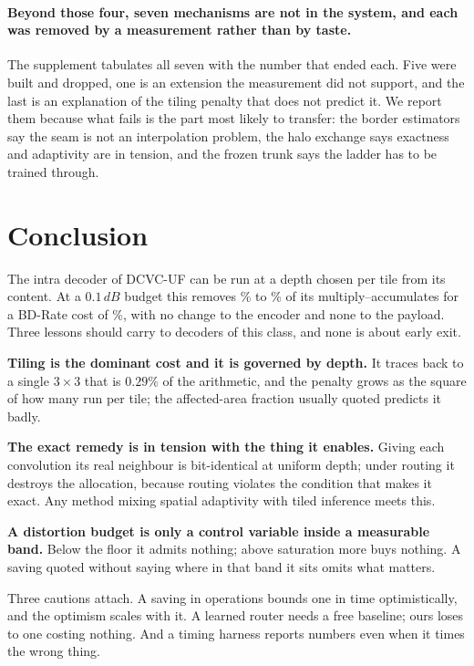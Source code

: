 \documentclass[10pt,twocolumn,letterpaper]{article}
\newcommand{\dB}{\,dB}
\begin{document}
\paragraph{Beyond those four, seven mechanisms are not in the system, and each
was removed by a measurement rather than by taste.} The supplement tabulates all
seven with the number that ended each. Five were built and dropped, one is an extension the
measurement did not support, and the last is an explanation of the tiling
penalty that does not predict it. We report them because what fails is the part
most likely to transfer: the border
estimators say the seam is not an interpolation problem, the halo exchange says
exactness and adaptivity are in tension, and the frozen trunk says the ladder
has to be trained through.


\section{Conclusion}

The intra decoder of DCVC-UF can be run at a depth chosen per tile from its
content. At a $0.1\dB$ budget this removes \MainLowRate\% to \MainHighRate\% of
its multiply--accumulates for a BD-Rate cost of \BdRateALow\%, with no change to
the encoder and none to the payload. Three lessons should carry to decoders of
this class, and none is about early exit.

\textbf{Tiling is the dominant cost and it is governed by depth.} It traces back
to a single $3\times3$ that is $0.29\%$ of the arithmetic, and the penalty grows
as the square of how many run per tile; the affected-area fraction usually
quoted predicts it badly.

\textbf{The exact remedy is in tension with the thing it enables.} Giving each
convolution its real neighbour is bit-identical at uniform depth; under routing
it destroys the allocation, because routing violates the condition that makes it
exact. Any method mixing spatial adaptivity with tiled inference meets this.

\textbf{A distortion budget is only a control variable inside a measurable band.}
Below the floor it admits nothing; above saturation more buys nothing. A saving
quoted without saying where in that band it sits omits what matters.

Three cautions attach. A saving in operations bounds one in time optimistically,
and the optimism scales with it. A learned router needs a free baseline; ours
loses to one costing nothing. And a timing harness reports numbers even when it
times the wrong thing.

{\small


}
\end{document}
